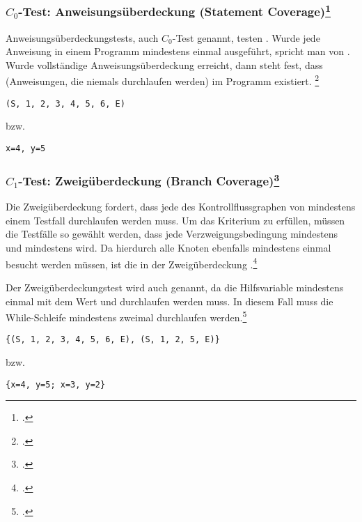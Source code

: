 \documentclass{lehramt-informatik-haupt}
\begin{document}
\beispiel

%

\subsubsection{$C_0$-Test: Anweisungsüberdeckung (Statement Coverage)\footcite[Seite 36]{sosy:fs:5}}

Anweisungsüberdeckungstests, auch $C_0$-Test genannt, testen . Wurde jede Anweisung in einem Programm
mindestens einmal ausgeführt, spricht man von . Wurde vollständige Anweisungsüberdeckung
erreicht, dann steht fest, dass  (Anweisungen,
die niemals durchlaufen werden) im Programm existiert.
\footcite{wiki:kontrollfluss-test}

\beispiel

\begin{center}
\texttt{(S, 1, 2, 3, 4, 5, 6, E)}

bzw.

\texttt{x=4, y=5}
\end{center}
%

\subsubsection{$C_1$-Test: Zweigüberdeckung (Branch Coverage)\footcite[Seite 37]{sosy:fs:5}}

Die Zweigüberdeckung fordert, dass jede  des
Kontrollflussgraphen von mindestens einem Testfall durchlaufen werden
muss. Um das Kriterium zu erfüllen, müssen die Testfälle so gewählt
werden, dass jede Verzweigungsbedingung mindestens 
und mindestens  wird. Da hierdurch alle Knoten
ebenfalls mindestens einmal besucht werden müssen, ist die
 in der Zweigüberdeckung .\footcite[Seite 209]{hoffmann:software}

Der Zweigüberdeckungstest wird auch
 genannt, da die Hilfsvariable
mindestens einmal mit dem Wert  und 
durchlaufen werden muss. In diesem Fall muss die While-Schleife
mindestens zweimal durchlaufen werden.\footcite{wiki:kontrollfluss-test}

\beispiel

\begin{center}
\texttt{\{(S, 1, 2, 3, 4, 5, 6, E), (S, 1, 2, 5, E)\}}

bzw.

\texttt{\{x=4, y=5; x=3, y=2\}}
\end{center}
\end{document}
